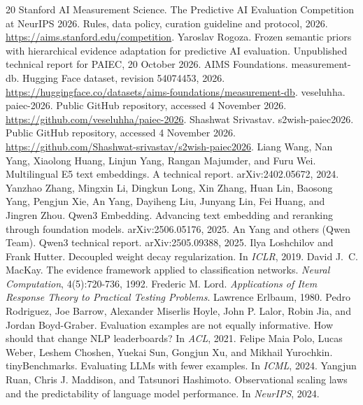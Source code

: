 \documentclass{article}
\begin{document}
\begingroup
\small
\begin{thebibliography}{20}
 Stanford AI Measurement Science. The Predictive AI Evaluation Competition at NeurIPS 2026. Rules, data policy, curation guideline and protocol, 2026. \url{https://aims.stanford.edu/competition}.
 Yaroslav Rogoza. Frozen semantic priors with hierarchical evidence adaptation for predictive AI evaluation. Unpublished technical report for PAIEC, 20 October 2026.
 AIMS Foundations. measurement-db. Hugging Face dataset, revision 54074453, 2026. \url{https://huggingface.co/datasets/aims-foundations/measurement-db}.
 veseluhha. paiec-2026. Public GitHub repository, accessed 4 November 2026. \url{https://github.com/veseluhha/paiec-2026}.
 Shashwat Srivastav. s2wish-paiec2026. Public GitHub repository, accessed 4 November 2026. \url{https://github.com/Shashwat-srivastav/s2wish-paiec2026}.
 Liang Wang, Nan Yang, Xiaolong Huang, Linjun Yang, Rangan Majumder, and Furu Wei. Multilingual E5 text embeddings. A technical report. arXiv:2402.05672, 2024.
 Yanzhao Zhang, Mingxin Li, Dingkun Long, Xin Zhang, Huan Lin, Baosong Yang, Pengjun Xie, An Yang, Dayiheng Liu, Junyang Lin, Fei Huang, and Jingren Zhou. Qwen3 Embedding. Advancing text embedding and reranking through foundation models. arXiv:2506.05176, 2025.
 An Yang and others (Qwen Team). Qwen3 technical report. arXiv:2505.09388, 2025.
 Ilya Loshchilov and Frank Hutter. Decoupled weight decay regularization. In \emph{ICLR}, 2019.
 David J.~C. MacKay. The evidence framework applied to classification networks. \emph{Neural Computation}, 4(5):720-736, 1992.
 Frederic M. Lord. \emph{Applications of Item Response Theory to Practical Testing Problems}. Lawrence Erlbaum, 1980.
 Pedro Rodriguez, Joe Barrow, Alexander Miserlis Hoyle, John P. Lalor, Robin Jia, and Jordan Boyd-Graber. Evaluation examples are not equally informative. How should that change NLP leaderboards? In \emph{ACL}, 2021.
 Felipe Maia Polo, Lucas Weber, Leshem Choshen, Yuekai Sun, Gongjun Xu, and Mikhail Yurochkin. tinyBenchmarks. Evaluating LLMs with fewer examples. In \emph{ICML}, 2024.
 Yangjun Ruan, Chris J. Maddison, and Tatsunori Hashimoto. Observational scaling laws and the predictability of language model performance. In \emph{NeurIPS}, 2024.

\end{thebibliography}
\end{document}
